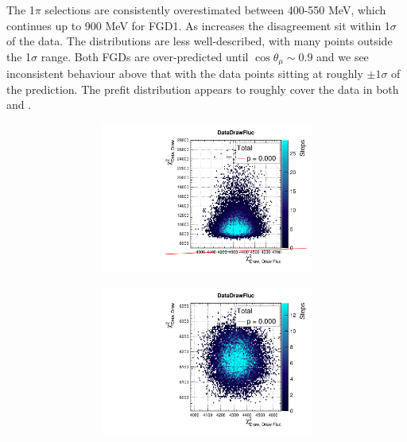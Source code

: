 The 1$\pi$ selections \pmu are consistently overestimated between 400-550 MeV, which continues up to 900 MeV for FGD1. As \pmu increases the disagreement sit within 1$\sigma$ of the data. The \cosmu distributions are less well-described, with many points outside the 1$\sigma$ range. Both FGDs are over-predicted until $\cos\theta_\mu\sim0.9$ and we see inconsistent behaviour above that with the data points sitting at roughly $\pm1\sigma$ of the prediction. The prefit distribution appears to roughly cover the data in both \pmu and \cosmu.
\begin{figure}[h]
	\begin{subfigure}[t]{\textwidth}
		\begin{subfigure}[t]{0.24\textwidth}
			\includegraphics[width=\textwidth, trim={0mm 0mm 0mm 8mm}, clip,page=10]{figures/mach3/2018/data/2018a_FixedCov_RedCov_Mpi_Data_merge_PriorPred_procs}
		\end{subfigure}
		\begin{subfigure}[t]{0.24\textwidth}
			\includegraphics[width=\textwidth, trim={0mm 0mm 0mm 8mm}, clip,page=10]{figures/mach3/2018/data/2018a_FixedCov_RedCov_Mpi_Data_merge_PostPredStore_FullLLH_procs}

\end{subfigure}
\end{subfigure}
\end{figure}
